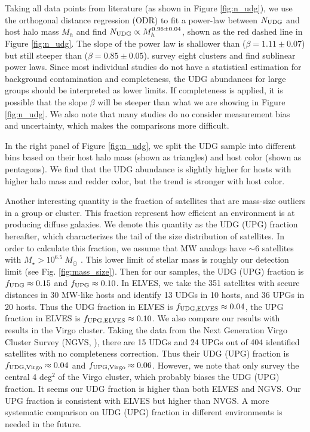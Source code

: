 \documentclass[twocolumn,astrosymb,twocolappendix]{aastex631}
\begin{document}
\begin{CJK*}{UTF8}{gbsn}
Taking all data points from literature (as shown in Figure \ref{fig:n_udg}), we use the orthogonal distance regression (ODR) to fit a power-law between $N_{\rm UDG}$ and host halo mass $M_h$ and find $N_{\rm UDG} \propto M_h^{0.96\pm 0.04}$, shown as the red dashed line in Figure \ref{fig:n_udg}. The slope of the power law is shallower than \citet{vdBurg2017} ($\beta=1.11\pm0.07$) but still steeper than \citet{Roman2017b} ($\beta=0.85\pm0.05$). \citet{ManceraPina2018} survey eight clusters and find sublinear power laws. Since most individual studies do not have a statistical estimation for background contamination and completeness, the UDG abundances for large groups should be interpreted as lower limits. If completeness is applied, it is possible that the slope $\beta$ will be steeper than what we are showing in Figure \ref{fig:n_udg}. We also note that many studies do no consider measurement bias and uncertainty, which makes the comparisons more difficult.

In the right panel of Figure \ref{fig:n_udg}, we split the UDG sample into different bins based on their host halo mass (shown as triangles) and host color (shown as pentagons). We find that the UDG abundance is slightly higher for hosts with higher halo mass and redder color, but the trend is stronger with host color. 

Another interesting quantity is the fraction of satellites that are mass-size outliers in a group or cluster. This fraction represent how efficient an environment is at producing diffuse galaxies. We denote this quantity as the UDG (UPG) fraction hereafter, which characterizes the tail of the size distribution of satellites. In order to calculate this fraction, we assume that MW analogs have $\sim 6$ satellites with $M_\star > 10^{6.5}\ M_\odot$ \citep{CarlstenELVES2022}. This lower limit of stellar mass is roughly our detection limit (see Fig. \ref{fig:mass_size}). Then for our samples, the UDG (UPG) fraction is $f_{\rm UDG} \approx 0.15$ and $f_{\rm UPG} \approx 0.10$. In ELVES, we take the 351 satellites with secure distances in 30 MW-like hosts and identify 13 UDGs in 10 hosts, and 36 UPGs in 20 hosts. Thus the UDG fraction in ELVES is $f_{\rm UDG, ELVES} \approx 0.04$, the UPG fraction in ELVES is $f_{\rm UPG, ELVES} \approx 0.10$. We also compare our results with results in the Virgo cluster. Taking the data from the Next Generation Virgo Cluster Survey (NGVS, \citealt{Ferrarese2020}), there are 15 UDGs and 24 UPGs out of 404 identified satellites with no completeness correction. Thus their UDG (UPG) fraction is $f_{\rm UDG,Virgo} \approx 0.04$ and $f_{\rm UPG,Virgo} \approx 0.06$. However, we note that \citet{Ferrarese2020} only survey the central 4 deg$^2$ of the Virgo cluster, which probably biases the UDG (UPG) fraction. It seems our UDG fraction is higher than both ELVES and NGVS. Our UPG fraction is consistent with ELVES but higher than NVGS. A more systematic comparison on UDG (UPG) fraction in different environments is needed in the future. 


\end{CJK*}
\end{document}
